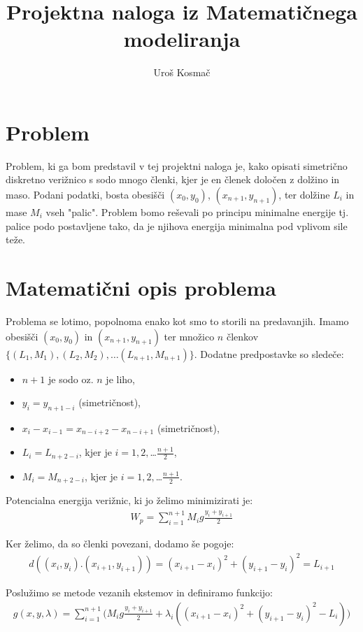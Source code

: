 \documentclass[a4paper,12pt]{article}
\title{Projektna naloga iz Matematičnega modeliranja}
\author{Uroš Kosmač}
\begin{document}
\maketitle

\section*{Problem}
Problem, ki ga bom predstavil v tej projektni naloga je, kako opisati simetrično 
diskretno verižnico s sodo mnogo členki, kjer je en členek določen z dolžino in maso.
Podani podatki, bosta obesišči $(x_0, y_0)$, $(x_{n+1}, y_{n+1})$, ter dolžine $L_i$ in 
mase $M_i$ vseh "palic".
Problem bomo reševali po principu minimalne energije tj. palice podo postavljene
tako, da je njihova energija minimalna pod vplivom sile teže.

\section*{Matematični opis problema}
Problema se lotimo, popolnoma enako kot smo to storili na predavanjih.
Imamo obesišči $(x_0, y_0)$ in $(x_{n+1}, y_{n+1})$ ter množico $n$ 
členkov \newline $\{(L_1, M_1), (L_2, M_2), \dots (L_{n+1}, M_{n+1})\}$. Dodatne predpostavke so sledeče:
\begin{itemize}
    \item $n+1$ je sodo oz. $n$ je liho,
    \item $y_i = y_{n+1-i}$ (simetričnost),
    \item $x_i - x_{i-1} = x_{n-i+2} - x_{n-i+1}$ (simetričnost),
    \item $L_i = L_{n+2-i}$, kjer je $i = 1, 2, $\dots$ \frac{n+1}{2}$,
    \item $M_i = M_{n+2-i}$, kjer je $i = 1, 2, $\dots$\frac{n+1}{2}$.
\end{itemize}

Potencialna energija verižnic, ki jo želimo minimizirati je:
\begin{align}
    W_p = \sum_{i=1}^{n+1} M_i g \frac{y_i + y_{i+1}}{2}
\end{align}

Ker želimo, da so členki povezani, dodamo še pogoje:
\begin{align}
    d((x_i, y_i). (x_{i+1}, y_{i+1})) = (x_{i+1} - x_i)^2 + (y_{i+1} - y_i)^2 = L_{i+1} 
\end{align}

Poslužimo se metode vezanih ekstemov in definiramo funkcijo:
\begin{align}
    g(x,y, \lambda) =  \sum_{i=1}^{n+1} \Big( M_i g \frac{y_i + y_{i+1}}{2} + \lambda_i((x_{i+1} - x_i)^2 + (y_{i+1} - y_i)^2 - L_i) \Big)
\end{align}
\end{document}
